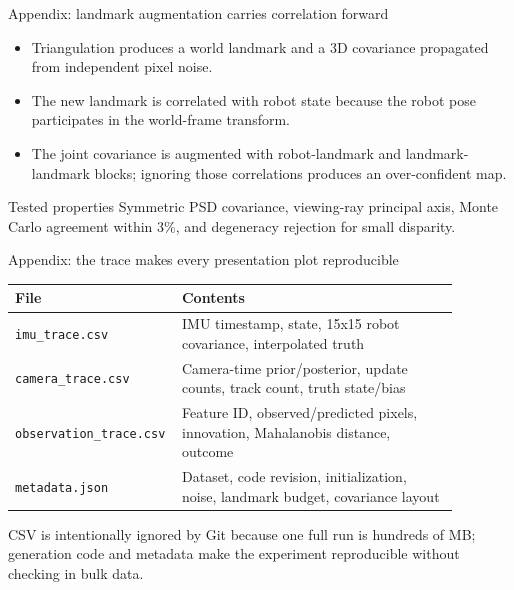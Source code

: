 \documentclass[10pt,aspectratio=169]{beamer}
\begin{document}
\begin{frame}{Appendix: landmark augmentation carries correlation forward}
  \begin{itemize}
    \item Triangulation produces a world landmark and a 3D covariance propagated from independent pixel noise.
    \item The new landmark is correlated with robot state because the robot pose participates in the world-frame transform.
    \item The joint covariance is augmented with robot-landmark and landmark-landmark blocks; ignoring those correlations produces an over-confident map.
  \end{itemize}
  \vspace{0.5em}
  \begin{block}{Tested properties}
    Symmetric PSD covariance, viewing-ray principal axis, Monte Carlo agreement within 3\%, and degeneracy rejection for small disparity.
  \end{block}
\end{frame}

\begin{frame}{Appendix: the trace makes every presentation plot reproducible}
  \small
  \begin{tabular}{p{0.27\linewidth}p{0.61\linewidth}}
    \toprule
    File & Contents \\
    \midrule
    \texttt{imu\_trace.csv} & IMU timestamp, state, 15x15 robot covariance, interpolated truth \\
    \texttt{camera\_trace.csv} & Camera-time prior/posterior, update counts, track count, truth state/bias \\
    \texttt{observation\_trace.csv} & Feature ID, observed/predicted pixels, innovation, Mahalanobis distance, outcome \\
    \texttt{metadata.json} & Dataset, code revision, initialization, noise, landmark budget, covariance layout \\
    \bottomrule
  \end{tabular}
  \vspace{0.8em}
  CSV is intentionally ignored by Git because one full run is hundreds of MB; generation code and metadata make the experiment reproducible without checking in bulk data.
\end{frame}
\end{document}
